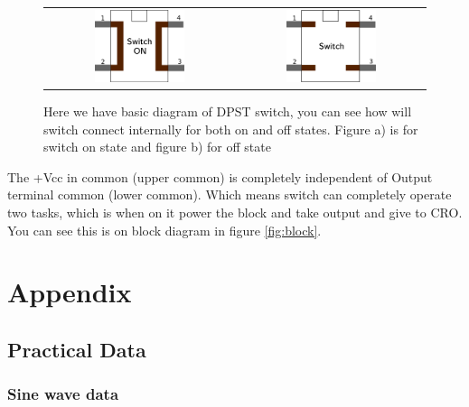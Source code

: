 \documentclass[14pt,a4paper]{extarticle}
\begin{document}
\begin{figure}[H]
\centering
\begin{tabular}{cc}
    \includegraphics[width=0.5\textwidth]{imgs/switchon.png}&
    \includegraphics[width=0.5\textwidth]{imgs/switchoff.png}
\end{tabular}
\caption{Here we have basic diagram of DPST switch, you can see how will switch connect internally for both on and off states. Figure a) is for switch on state and figure b) for off state}
\label{fig:switch}    
\end{figure}


The +Vcc in common (upper common) is completely independent of Output terminal common (lower common). Which means switch can completely operate two tasks, which is when on it power the block and take output and give to CRO. You can see this is on block diagram in figure \ref{fig:block}.


\section{Appendix}
\label{sec:org8751d62}

\subsection{Practical Data}
\label{sec:org6e71075}
\subsubsection{Sine wave data}
\label{sec:org76e162b}
\end{document}
